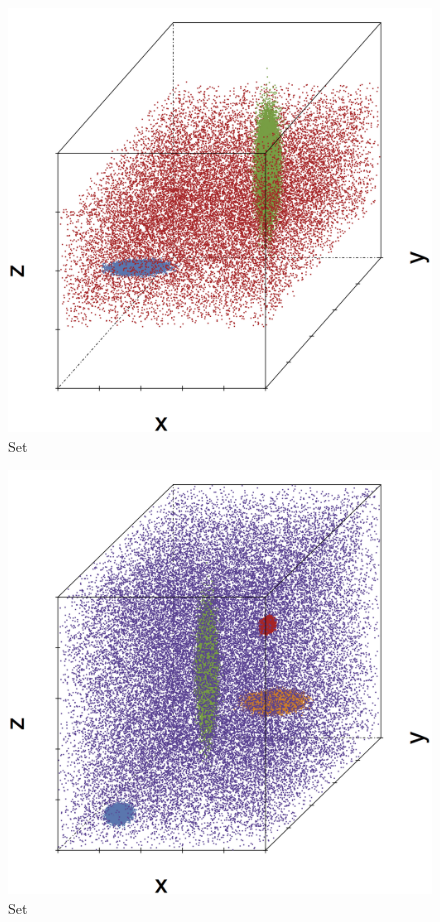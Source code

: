\begin{subfigure}{0.18\textwidth}
	\centering
	\includegraphics[width=\textwidth]{3/img/datasetplot_baakman_2_60000.png}
	\caption{Set \baakmanTwo}
	\label{fig:3:simulated:datasets:baakman2}
\end{subfigure}	
\begin{subfigure}{0.18\textwidth}
	\centering
	\includegraphics[width=\textwidth]{3/img/datasetplot_baakman_3_120000.png}
	\caption{Set \baakmanThree}
	\label{fig:3:simulated:datasets:baakman3}
\end{subfigure}				
